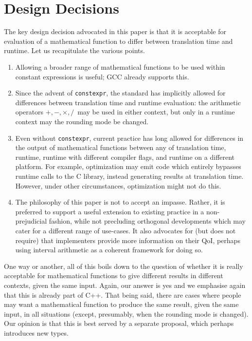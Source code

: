 \documentclass[prd,twocolumn,amsmath,amssymb,nofootinbib,eqsecnum]{revtex4-1}
\newcommand{\constexpr}{\code{constexpr}\xspace}
\newcommand{\code}[1]{{\tt #1}}
\newcommand{\Operators}{\ensuremath{+,-,\times,/}}
\begin{document}
\section{Design Decisions}

The key design decision advocated in this paper is that it is acceptable for evaluation of a mathematical function to differ between translation time and runtime. Let us recapitulate the various points.

\begin{enumerate}
	\item Allowing a broader range of mathematical functions to be used within constant expressions is useful; GCC already supports this.
	
	\item Since the advent of \constexpr, the standard has implicitly allowed for differences between translation time and runtime evaluation: the arithmetic operators \Operators\ may be used in either context, but only in a runtime context may the rounding mode be changed.
	
	\item Even without \constexpr, current practice has long allowed for differences in the output of mathematical functions between any of translation time, runtime, runtime with different compiler flags, and runtime on a different platform. For example, optimization may emit code which entirely bypasses runtime calls to the C library, instead generating results at translation time. However, under other circumstances, optimization might not do this.
	
	\item The philosophy of this paper is not to accept an impasse. Rather, it is preferred to support
	a useful extension to existing practice in a non-prejudicial fashion, while not precluding 
	orthogonal developments which may cater for a different range of use-cases. It also advocates
	for (but does not require) that implementers provide more information on their QoI, perhaps using 
	interval arithmetic as a coherent framework for doing so.
\end{enumerate}



One way or another, all of this boils down to the question of whether it is really acceptable for mathematical functions to give different results in different contexts, given the same input. Again, our answer is yes and we emphasise again that this is already part of C++. That being said, there are cases where people may want a mathematical function to produce the same result, given the same input, in all situations (except, presumably, when the rounding mode is changed). Our opinion is that this is best served by a separate proposal, which perhaps introduces new types.
\end{document}
